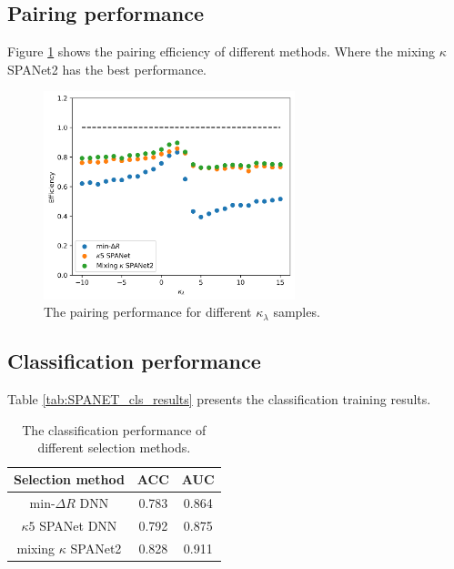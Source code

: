 \documentclass[12pt]{article}
\begin{document}
	\subsection{Pairing performance}%
	\label{sub:pairing_performance}
		Figure \ref{fig:pairing_performance_kappa} shows the pairing efficiency of different methods. Where the mixing $\kappa$ SPANet2 has the best performance.
		\begin{figure}[htpb]
			\centering
			\includegraphics[width=0.65\textwidth]{pairing_efficiency_kappa-SPANet2.png}
			\caption{The pairing performance for different $\kappa_\lambda$ samples.}
			\label{fig:pairing_performance_kappa}
		\end{figure}

	\subsection{Classification performance}%
	\label{sub:classification_performance}
		Table \ref{tab:SPANET_cls_results} presents the classification training results.
		\begin{table}[htpb]
			\centering
			\caption{The classification performance of different selection methods.}
			\label{tab:classification_results_summary}
			\begin{tabular}{c|cc}
			Selection method          & ACC   & AUC   \\ \hline
			$\text{min-}\Delta R$ DNN & 0.783 & 0.864 \\
			$\kappa 5$ SPANet DNN     & 0.792 & 0.875 \\
			mixing $\kappa$ SPANet2   & 0.828 & 0.911
			\end{tabular}			
		\end{table}

\end{document}
